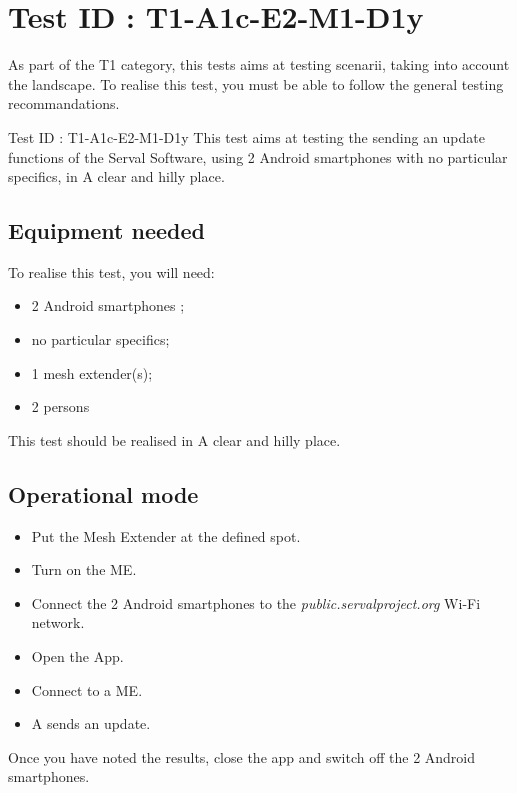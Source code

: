 \documentclass[oneside]{book}
\begin{document}
\section{Test ID : T1-A1c-E2-M1-D1y}
\begin{itshape}
As part of the T1 category, this tests aims at testing scenarii, taking into account the landscape. 
To realise this test, you must be able to follow the general testing recommandations.
\end{itshape}
\newline
Test ID : T1-A1c-E2-M1-D1y
 This test aims at testing the sending an update functions of the Serval Software, using 2 Android smartphones with no particular specifics, in A clear and hilly place.
\subsection{Equipment needed} To realise this test, you will need:
\begin{itemize}
\item 2 Android smartphones ;
\item no particular specifics;
\item 1 mesh extender(s);
\item 2 persons
\end{itemize}
This test should be realised in A clear and hilly place.
\subsection{Operational mode} \begin{itemize}
\item Put the Mesh Extender at the defined spot.
\item Turn on the ME.
\item Connect the 2 Android smartphones to the \emph{public.servalproject.org} Wi-Fi network.
\item Open the App.
\item Connect to a ME.
\item A sends an update.
\end{itemize}
Once you have noted the results, close the app and switch off the 2 Android smartphones.
\end{document}
